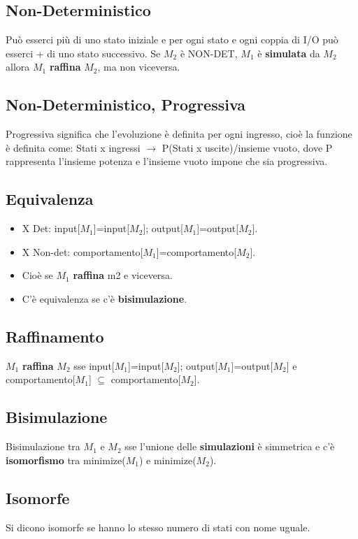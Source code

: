 \documentclass[a4paper]{article}
\begin{document}
\subsection{Non-Deterministico}
Può esserci più di uno stato iniziale e per ogni stato e ogni coppia di I/O può esserci + di uno stato successivo. Se $M_2$ è NON-DET, $M_1$ è \textbf{simulata} da $M_2$ allora $M_1$ \textbf{raffina} $M_2$, ma non viceversa.

\subsection{Non-Deterministico, Progressiva}
Progressiva significa che l'evoluzione è definita per ogni ingresso, cioè la funzione è definita come: Stati x ingressi $\rightarrow$ P(Stati x uscite)/insieme vuoto, dove P rappresenta l'insieme potenza e l'insieme vuoto impone che sia progressiva.

\subsection{Equivalenza}

\begin{itemize}
\item X Det: input[$M_1$]=input[$M_2$]; output[$M_1$]=output[$M_2$].
\item X Non-det: comportamento[$M_1$]=comportamento[$M_2$].
\item Cioè se $M_1$ \textbf{raffina} m2 e viceversa.
\item C'è equivalenza se c'è \textbf{bisimulazione}.
\end{itemize}

\subsection{Raffinamento}
$M_1$ \textbf{raffina} $M_2$ sse input[$M_1$]=input[$M_2$]; output[$M_1$]=output[$M_2$] e comportamento[$M_1$] $\subseteq$ comportamento[$M_2$].

\subsection{Bisimulazione}
Bisimulazione tra $M_1$ e $M_2$ sse l'unione delle \textbf{simulazioni} è simmetrica e c'è \textbf{isomorfismo} tra minimize($M_1$) e minimize($M_2$).

\subsection{Isomorfe}
Si dicono isomorfe se hanno lo stesso numero di stati con nome uguale.
\end{document}
